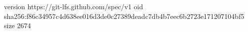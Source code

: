 version https://git-lfs.github.com/spec/v1
oid sha256:f86c34957c4d638ee016d3de0c27389deadc7db4b7eec6b2723e171207104bf5
size 2674
